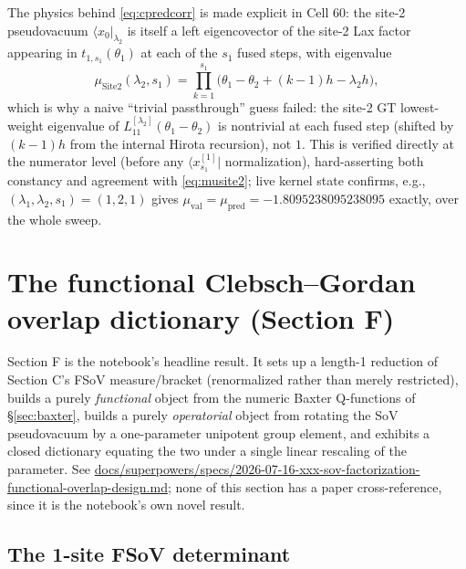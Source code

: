 \documentclass[11pt]{article}
\begin{document}
The physics behind \eqref{eq:cpredcorr} is made explicit in Cell 60: the site-2 pseudovacuum
$\langle x_0|_{\lambda_2}$ is itself a left eigencovector of the site-2 Lax factor appearing in
$t_{1,s_1}(\theta_1)$ at each of the $s_1$ fused steps, with eigenvalue
\begin{equation}
  \mu_{\mathrm{Site2}}(\lambda_2,s_1) = \prod_{k=1}^{s_1}\bigl(\theta_1-\theta_2+(k-1)h-\lambda_2 h\bigr),
  \label{eq:musite2}
\end{equation}
which is why a naive ``trivial passthrough'' guess failed: the site-2 GT lowest-weight eigenvalue of
$L^{[\lambda_2]}_{11}(\theta_1-\theta_2)$ is nontrivial at each fused step (shifted by $(k-1)h$ from
the internal Hirota recursion), not $1$. This is verified directly at the numerator level (before
any $\langle x^{[1]}_{s_1}|$ normalization), hard-asserting both constancy and agreement with
\eqref{eq:musite2}; live kernel state confirms, e.g., $(\lambda_1,\lambda_2,s_1)=(1,2,1)$ gives
$\mu_{\mathrm{val}}=\mu_{\mathrm{pred}}=-1.8095238095238095$ exactly, over the whole sweep.

\section{The functional Clebsch--Gordan overlap dictionary (Section F)}
\label{sec:dictionary}

Section F is the notebook's headline result. It sets up a length-1 reduction of Section C's FSoV
measure/bracket (renormalized rather than merely restricted), builds a purely \emph{functional}
object from the numeric Baxter Q-functions of \S\ref{sec:baxter}, builds a purely
\emph{operatorial} object from rotating the SoV pseudovacuum by a one-parameter unipotent group
element, and exhibits a closed dictionary equating the two under a single linear rescaling of the
parameter. See
\url{docs/superpowers/specs/2026-07-16-xxx-sov-factorization-functional-overlap-design.md}; none
of this section has a paper cross-reference, since it is the notebook's own novel result.

\subsection{The 1-site FSoV determinant}
\end{document}
